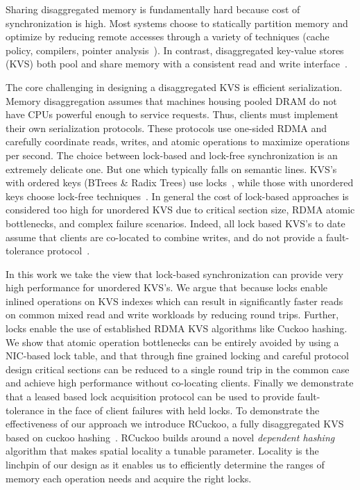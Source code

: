 Sharing disaggregated memory is fundamentally hard because cost of synchronization is high.  Most
systems choose to statically partition memory and optimize by reducing remote accesses through a
variety of techniques (cache policy, compilers, pointer
analysis~\cite{kona,mira,aifm,trackfm,carbink}). In contrast, disaggregated key-value stores (KVS)
both pool and share memory with a consistent read and write
interface~\cite{rolex,smart,ditto,fusee,clover,sherman,ford}.

The core challenging in designing a disaggregated KVS is efficient serialization. Memory
disaggregation assumes that machines housing pooled DRAM do not have CPUs powerful enough to service
requests. Thus, clients must implement their own serialization protocols. These protocols use
one-sided RDMA and carefully coordinate reads, writes, and atomic operations to maximize operations
per second.  The choice between lock-based and lock-free synchronization is an extremely delicate
one. But one which typically falls on semantic lines. KVS's with ordered keys (BTrees \& Radix
Trees) use locks~\cite{sherman,smart}, while those with unordered keys choose lock-free
techniques~\cite{rolex,ditto,fusee,clover}. In general the cost of lock-based approaches is
considered too high for unordered KVS due to critical section size, RDMA atomic bottlenecks, and
complex failure scenarios. Indeed, all lock based KVS's to date assume that clients are co-located
to combine writes, and do not provide a fault-tolerance protocol~\cite{sherman,smart}.

In this work we take the view that lock-based synchronization can provide very high performance for
unordered KVS's. We argue that because locks enable inlined operations on KVS indexes which can
result in significantly faster reads on common mixed read and write workloads by reducing round
trips. Further, locks enable the use of established RDMA KVS algorithms like Cuckoo hashing.  We
show that atomic operation bottlenecks can be entirely avoided by using a NIC-based lock table, and
that through fine grained locking and careful protocol design critical sections can be reduced to a
single round trip in the common case and achieve high performance without co-locating clients.
Finally we demonstrate that a leased based lock acquisition protocol can be used to provide
fault-tolerance in the face of client failures with held locks.  To demonstrate the effectiveness of
our approach we introduce RCuckoo, a fully disaggregated KVS based on cuckoo hashing~\cite{cuckoo}.
RCuckoo builds around a novel \emph{dependent hashing} algorithm that makes spatial locality a
tunable parameter. Locality is the linchpin of our design as it enables us to efficiently determine
the ranges of memory each operation needs and acquire the right locks.



